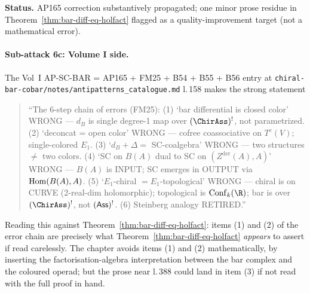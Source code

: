 \textbf{Status.} AP165 correction substantively propagated; one minor prose residue in Theorem~\ref*{thm:bar-diff-eq-holfact} flagged as a quality-improvement target (not a mathematical error).

\paragraph{Sub-attack 6c: Volume I side.} The Vol~I AP-SC-BAR = AP165 + FM25 + B54 + B55 + B56 entry at \texttt{chiral-bar-cobar/notes/antipatterns\_catalogue.md} l.\,158 makes the strong statement
\begin{quote}
``The 6-step chain of errors (FM25): (1) `bar differential is closed color' WRONG --- $d_B$ is single degree-1 map over $(\ChirAss)^!$, not parametrized. (2) `deconcat = open color' WRONG --- cofree coassociative on $T^c(V)$; single-colored $E_1$. (3) `$d_B + \Delta = $ SC-coalgebra' WRONG --- two structures $\ne$ two colors. (4) `SC on $B(A)$ dual to SC on $(Z^{\mathrm{der}}(A), A)$' WRONG --- $B(A)$ is INPUT; SC emerges in OUTPUT via $\mathrm{Hom}(B(A), A)$. (5) `$E_1$-chiral $= E_1$-topological' WRONG --- chiral is on CURVE (2-real-dim holomorphic); topological is $\Conf_k(\R)$; bar is over $(\ChirAss)^!$, not $(\mathsf{Ass})^!$. (6) Steinberg analogy RETIRED.''
\end{quote}

Reading this against Theorem~\ref*{thm:bar-diff-eq-holfact}: items (1) and (2) of the error chain are precisely what Theorem~\ref*{thm:bar-diff-eq-holfact} \emph{appears} to assert if read carelessly. The chapter avoids items (1) and (2) mathematically, by inserting the factorisation-algebra interpretation between the bar complex and the coloured operad; but the prose near l.\,388 could land in item (3) if not read with the full proof in hand.

